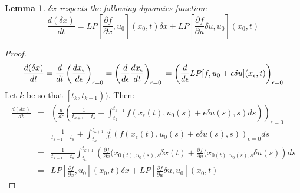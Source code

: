 \documentclass[a4paper,10pt]{article}
\newtheorem{lemm}{Lemma}
\begin{document}
\begin{lemm} \label{deltax}
    $\delta x$ respects the following dynamics function:
    \begin{equation}
	\frac{d(\delta x)}{dt} = 
	LP\left[ \frac{\partial f}{\partial x}, u_{0}\right](x_{0},t) \delta x
        +LP\left[ \frac{\partial f}{\partial u} \delta u, u_{0}\right](x_{0},t) 
	\label{VarDyn}
    \end{equation}
\end{lemm}
\begin{proof}
\[
            \frac{d(\delta x)}{dt} = \frac{d}{dt}\left(\frac{dx_{\epsilon}}{d \epsilon}\right)_{\epsilon =0}
              = \left(\frac{d}{d \epsilon}\frac{dx_{\epsilon}}{dt}\right)_{\epsilon =0}\\
              = \left(\frac{d}{d \epsilon}LP[f,u_{0}+\epsilon \delta u](x_{\epsilon},t)\right)_{\epsilon =0}
\]
    Let $k$ be so that $\left[t_{k},t_{k+1}\right))$. Then:
    \begin{eqnarray*}
        \frac{d(\delta x)}{dt} & = & 
	\left(\frac{d}{d \epsilon}\left(\frac{1}{t_{k+1}-t_{k}} 
	+\int_{t_{k}}^{t_{k+1}}f(x_{\epsilon}(t),u_{0}(s)+\epsilon \delta u(s),s)ds\right)\right)
	_{\epsilon =0}\\
         & = & \frac{1}{t_{k+1}-t_{k}} 
	+ \int_{t_{k}}^{t_{k+1}}\frac{d}{d \epsilon}
	\left(f(x_{\epsilon}(t),u_{0}(s)+\epsilon \delta u(s),s)\right)_{\epsilon =0}ds \\
         & = & \frac{1}{t_{k+1}-t_{k}} \int_{t_{k}}^{t_{k+1}} \left(
	\frac{\partial f}{\partial x}(x_{0(t),u_{0}(s),s}\delta x(t)
	+\frac{\partial f}{\partial u}(x_{0(t),u_{0}(s),s}\delta u(s)
	\right) ds \\
        & = & LP\left[ \frac{\partial f}{\partial x}, 
	 u_{0}\right](x_{0},t) \delta x 
	   + LP\left[ \frac{\partial f}{\partial u} \delta u, u_{0}\right](x_{0},t) 
    \end{eqnarray*}
\end{proof}
\end{document}

